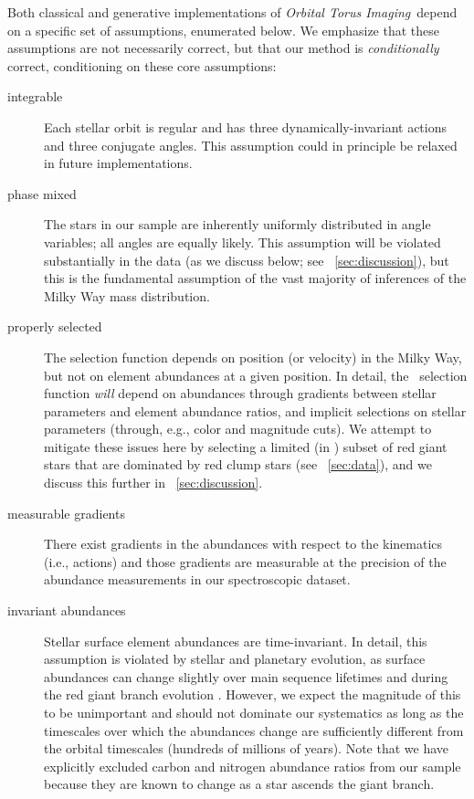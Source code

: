 \documentclass[modern]{aastex63}
\newcommand{\methodname}{\textsl{Orbital Torus Imaging}}
\newcommand{\apogee}{\acronym{APOGEE}}
\begin{document}
Both classical and generative implementations of \methodname\ depend on a
specific set of assumptions, enumerated below.
We emphasize that these assumptions are not necessarily correct, but that our
method is \emph{conditionally} correct, conditioning on these core assumptions:
\begin{description}
\item[integrable] Each stellar orbit is regular and has three
  dynamically-invariant actions and three conjugate angles. This assumption
  could in principle be relaxed in future implementations.
\item[phase mixed] The stars in our sample are inherently uniformly distributed
  in angle variables; all angles are equally likely. This assumption will be
  violated substantially in the data (as we discuss below; see
  \sectionname~\ref{sec:discussion}), but this is the fundamental assumption of
  the vast majority of inferences of the Milky Way mass distribution.
\item[properly selected] The selection function depends on position (or
  velocity) in the Milky Way, but not on element abundances at a given position.
  In detail, the \apogee\ selection function \emph{will} depend on abundances
  through gradients between stellar parameters and element abundance ratios, and
  implicit selections on stellar parameters (through, e.g., color and magnitude
  cuts). We attempt to mitigate these issues here by selecting a limited (in
  \logg) subset of red giant stars that are dominated by red clump stars (see
  \sectionname~\ref{sec:data}), and we discuss this further in
  \sectionname~\ref{sec:discussion}.
\item[measurable gradients] There exist gradients in the abundances with respect
  to the kinematics (i.e., actions) and those gradients are measurable at the
  precision of the abundance measurements in our spectroscopic dataset.
\item[invariant abundances] Stellar surface element abundances are
  time-invariant. In detail, this assumption is violated by stellar and
  planetary evolution, as surface abundances can change slightly over main
  sequence lifetimes \citep{TODO} and during the red giant branch evolution
  \citep{TODO}. However, we expect the magnitude of this to be unimportant and
  should not dominate our systematics as long as the timescales over which the
  abundances change are sufficiently different from the orbital timescales
  (hundreds of millions of years). Note that we have explicitly excluded carbon
  and nitrogen abundance ratios from our sample because they are known to change
  as a star ascends the giant branch.
\end{description}
\end{document}
